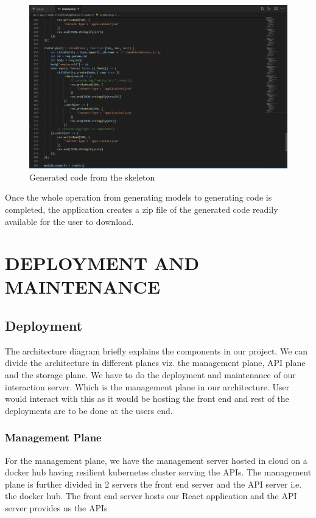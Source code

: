 \documentclass[letterpaper, 10 pt, conference]{ieeeconf}
\begin{document}
\begin{figure}[h]
   \centering
   \includegraphics[scale=0.215]{./fig9.png}
   \caption{Generated code from the skeleton}
   \label{fig:my_label}
\end{figure}

Once the whole operation from generating models to generating code is completed, the application creates a zip file of the generated code readily available for the user to download.

\section{DEPLOYMENT AND MAINTENANCE}
\subsection{Deployment}
The architecture diagram briefly explains the components in our project. We can divide the architecture in different planes viz. the management plane, API plane and the storage plane. We have to do the deployment and maintenance of our interaction server. Which is the management plane in our architecture. User would interact with this as it would be hosting the front end and rest of the deployments are to be done at the users end.
\subsubsection{Management Plane}
For the management plane, we have the management server hosted in cloud on a docker hub having resilient kubernetes cluster serving the APIs. The management plane is further divided in 2 servers the front end server and the API server i.e. the docker hub. The front end server hosts our React application and the API server provides us the APIs
\end{document}
